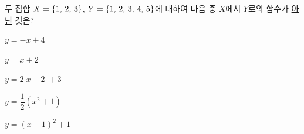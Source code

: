 \hspace*{2mm}\begin{minipage}[t]{\dimexpr\linewidth-2mm\relax}\vspace{0pt}
두 집합 $X=\{1,\mkern3mu 2,\mkern3mu 3\}$, $Y=\{1,\mkern3mu 2,\mkern3mu 3,\mkern3mu 4,\mkern3mu 5\}$에 대하여 다음 중 $X$에서 $Y$로의 함수가 \underline{아닌} 것은?
\begin{choicesii}{\rule[-3ex]{0pt}{8ex}$y=-x+4$}{\rule[-3ex]{0pt}{8ex}$y=x+2$}{\rule[-3ex]{0pt}{8ex}$y=2|x-2|+3$}{\rule[-3ex]{0pt}{8ex}$y=\dfrac{1}{2}(x^2+1)$}{\rule[-3ex]{0pt}{8ex}$y=(x-1)^2+1$}\end{choicesii}\end{minipage}
